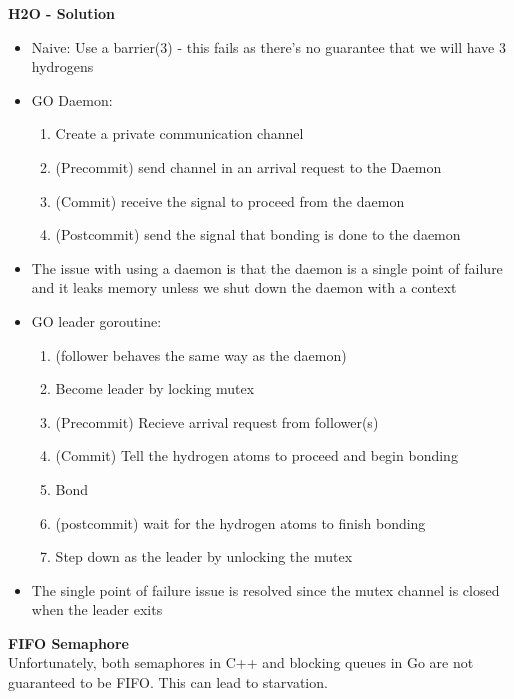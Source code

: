 \documentclass[10pt, landscape]{article}
\begin{document}
\begin{multicols}{4}
\textbf{H2O - Solution} \\
\begin{itemize}
    \item Naive: Use a barrier(3) - this fails as there's no guarantee that we will have 3 hydrogens
    \item GO Daemon:
    \begin{enumerate}
        \item Create a private communication channel 
        \item (Precommit) send channel in an arrival request to the Daemon
        \item (Commit) receive the signal to proceed from the daemon 
        \item (Postcommit) send the signal that bonding is done to the daemon
    \end{enumerate}
    \item The issue with using a daemon is that the daemon is a single point of failure and it leaks memory unless we shut down the daemon with a context 
    \item GO leader goroutine:
    \begin{enumerate}
        \item (follower behaves the same way as the daemon)
        \item Become leader by locking mutex 
        \item (Precommit) Recieve arrival request from follower(s)
        \item (Commit) Tell the hydrogen atoms to proceed and begin bonding 
        \item Bond 
        \item (postcommit) wait for the hydrogen atoms to finish bonding 
        \item Step down as the leader by unlocking the mutex 
    \end{enumerate}
    \item The single point of failure issue is resolved since the mutex channel is closed when the leader exits
\end{itemize}

\textbf{FIFO Semaphore} \\
Unfortunately, both semaphores in C++ and blocking queues in Go are not guaranteed to be FIFO. This can lead to starvation. \\ 


\end{multicols}
\end{document}

